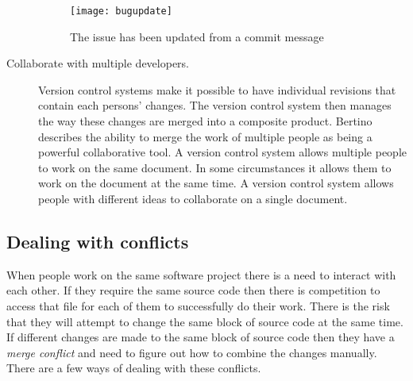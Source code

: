 \begin{description}
  \begin{figure}[!T]
   \begin{center}
    \texttt{[image: bugupdate]}
   \end{center}
   \caption{The issue has been updated from a commit message}
   \label{fig:bgBugUpdate}
  \end{figure}

  \item [Collaborate with multiple developers.]
  Version control systems make it possible to have individual revisions that contain each persons' changes. The version control system then manages the way these changes are merged into a composite product. Bertino \cite{Bertino2012} describes the ability to merge the work of multiple people as being a powerful collaborative tool. A version control system allows multiple people to work on the same document. In some circumstances it allows them to work on the document at the same time.  A version control system allows people with different ideas to collaborate on a single document.


\end{description}



\subsection{Dealing with conflicts}
When people work on the same software project there is a need to interact with each other.
If they require the same source code then there is competition to access that file for each of them to successfully do their work.
There is the risk that they will attempt to change the same block of source code at the same time.
If different changes are made to the same block of source code then they have a \emph{merge conflict} and need to figure out how to combine the changes manually.
There are a few ways of dealing with these conflicts.

